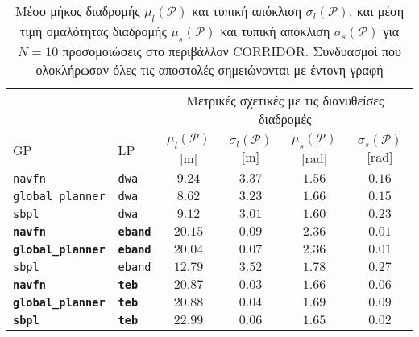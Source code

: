 \begin{table}[h]
\renewcommand{\arraystretch}{1.3}
\begin{tabular}{llcccc}
  & & \multicolumn{4}{c}{Μετρικές σχετικές με τις διανυθείσες διαδρομές} \\
  \cline{3-6}
  GP & LP & $\mu_{l}(\bm{\mathcal{P}})$ [m] & $\sigma_{l}(\bm{\mathcal{P}})$ [m] & $\mu_{s}(\bm{\mathcal{P}})$ [rad] & $\sigma_{s}(\bm{\mathcal{P}})$ [rad] \\ \toprule
  \texttt{navfn} & \texttt{dwa} & $9.24$ & $3.37$ & $1.56$ & $0.16$ \\
  \texttt{global\_planner} & \texttt{dwa} & $8.62$ & $3.23$ & $1.66$ & $0.15$ \\
  \texttt{sbpl} & \texttt{dwa} & $9.12$ & $3.01$ & $1.60$ & $0.23$ \\
  \textbf{\texttt{navfn}} & \textbf{\texttt{eband}} & $\bm{20.15}$ & $\bm{0.09}$ & $\bm{2.36}$ & $\bm{0.01}$ \\
  \textbf{\texttt{global\_planner}} & \textbf{\texttt{eband}} & $\bm{20.04}$ & $\bm{0.07}$ & $\bm{2.36}$ & $\bm{0.01}$ \\
  \texttt{sbpl} & \texttt{eband} & $12.79$ & $3.52$ & $1.78$ & $0.27$ \\
  \textbf{\texttt{navfn}} & \textbf{\texttt{teb}} & $\bm{20.87}$ & $\bm{0.03}$ & $\bm{1.66}$ & $\bm{0.06}$ \\
  \textbf{\texttt{global\_planner}} & \textbf{\texttt{teb}} & $\bm{20.88}$ & $\bm{0.04}$ & $\bm{1.69}$ & $\bm{0.09}$ \\
  \textbf{\texttt{sbpl}} & \textbf{\texttt{teb}} & $\bm{22.99}$ & $\bm{0.06}$ & $\bm{1.65}$ & $\bm{0.02}$ \\ \bottomrule
\end{tabular}
\caption{\small Μέσο μήκος διαδρομής $\mu_{l}(\bm{\mathcal{P}})$ και τυπική
         απόκλιση $\sigma_{l}(\bm{\mathcal{P}})$, και μέση τιμή ομαλότητας
         διαδρομής $\mu_{s}(\bm{\mathcal{P}})$ και τυπική απόκλιση
         $\sigma_{s}(\bm{\mathcal{P}})$ για $N=10$ προσομοιώσεις στο περιβάλλον
         CORRIDOR. Συνδυασμοί που ολοκλήρωσαν όλες τις αποστολές  σημειώνονται
         με έντονη γραφή}
\label{tbl:info_ground_truth_corridor}
\end{table}

